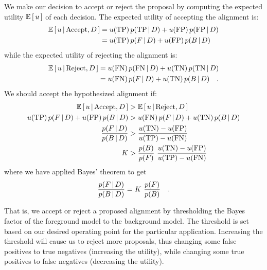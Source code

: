 We make our decision to accept or reject the proposal by computing the
expected utility $\mathbb{E}\left[ \, u \, \right]$ of each decision.  The expected utility
of accepting the alignment is:
\begin{align}
\mathbb{E}\left[ \, u \,\vert\, \mathrm{Accept}, D \, \right]
&= u(\mathrm{TP}) \, p(\mathrm{TP} \,\vert\, D) + u(\mathrm{FP}) \, p(\mathrm{FP} \,\vert\, D) \\
&= u(\mathrm{TP}) \, p(F \,\vert\, D) + u(\mathrm{FP}) \, p(B \,\vert\, D)
\end{align}
while the expected utility of rejecting the alignment is:
\begin{align}
\mathbb{E}\left[ \, u \,\vert\, \mathrm{Reject}, D \, \right]
&= u(\mathrm{FN}) \, p(\mathrm{FN} \,\vert\, D) + u(\mathrm{TN}) \, p(\mathrm{TN} \,\vert\, D) \\
&= u(\mathrm{FN}) \, p(F \,\vert\, D) + u(\mathrm{TN}) \, p(B \,\vert\, D) \quad .
\end{align}
We should accept the hypothesized alignment if:
\begin{align}
\expect{u \given \mathrm{Accept}, \data} 
&>
\expect{u \given \mathrm{Reject}, \data} \\
%
u(\truepos) \, p(\fg \given \data) + u(\falsepos) \, p(\bg \given \data)
&>
u(\falseneg) \, p(\fg \given \data) + u(\trueneg) \, p(\bg \given \data) \\
%
%
\frac{p(\fg \given \data)}{p(\bg \given \data)}
&>
\frac{u(\trueneg) - u(\falsepos)}{u(\truepos) - u(\falseneg)} \\
%
K &> \frac{p(\bg)}{p(\fg)} \ \frac{u(\trueneg) - u(\falsepos)}{u(\truepos) - u(\falseneg)}
\label{eq:kthresh}
\end{align}
where we have applied Bayes' theorem to get
\begin{equation}
\frac{p(F \,\vert\, D)}{p(B \,\vert\, D)} = K \ \frac{p(F)}{p(B)} \quad .
\end{equation}


That is, we accept or reject a proposed alignment by thresholding the
Bayes factor of the foreground model to the background model.  The
threshold is set based on our desired operating point for the
particular application.  Increasing the threshold will cause us to
reject more proposals, thus changing some false positives to true
negatives (increasing the utility), while changing some true positives
to false negatives (decreasing the utility).


